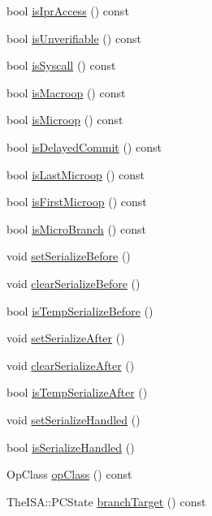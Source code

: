 \begin{DoxyCompactItemize}
bool \hyperlink{classBaseDynInst_aa201775c9e5befb0bf84cdd7b24519b3}{isIprAccess} () const 
\item 
bool \hyperlink{classBaseDynInst_ae9cbcc655cf8d63153d0c3f8bbf59841}{isUnverifiable} () const 
\item 
bool \hyperlink{classBaseDynInst_afa3ec9c6fc7c50b26c6811c3bf1bb5f0}{isSyscall} () const 
\item 
bool \hyperlink{classBaseDynInst_a1f7c99c1d36381c9aff41f00261d06df}{isMacroop} () const 
\item 
bool \hyperlink{classBaseDynInst_a19f74cdac8afa870418c056c72645187}{isMicroop} () const 
\item 
bool \hyperlink{classBaseDynInst_aebb2ebf9a7a910fcd247833ab88843b3}{isDelayedCommit} () const 
\item 
bool \hyperlink{classBaseDynInst_ac600348c1afe65d9299c9635d6ea5773}{isLastMicroop} () const 
\item 
bool \hyperlink{classBaseDynInst_a937b23736e22f67d6b168c0c029deec4}{isFirstMicroop} () const 
\item 
bool \hyperlink{classBaseDynInst_a369f5792a76744815dbb1bcba6e25618}{isMicroBranch} () const 
\item 
void \hyperlink{classBaseDynInst_a820fdb5f79e789fc8efffb15f1995695}{setSerializeBefore} ()
\item 
void \hyperlink{classBaseDynInst_a09b692cf6e7b00c1160248452fa24d4b}{clearSerializeBefore} ()
\item 
bool \hyperlink{classBaseDynInst_a4df2bcaf5414d6db99fb8a5b0aba708a}{isTempSerializeBefore} ()
\item 
void \hyperlink{classBaseDynInst_a3e4776abfedcc80df8c826a7f3c3efd3}{setSerializeAfter} ()
\item 
void \hyperlink{classBaseDynInst_abe42baa87e7660df60248deec78f8d5a}{clearSerializeAfter} ()
\item 
bool \hyperlink{classBaseDynInst_a8d1ad9904dbbde344554070bfaaab86f}{isTempSerializeAfter} ()
\item 
void \hyperlink{classBaseDynInst_ad115419b3ec6552a9db93ba349c73285}{setSerializeHandled} ()
\item 
bool \hyperlink{classBaseDynInst_a33db384950219c3c71206fbb2c7d8025}{isSerializeHandled} ()
\item 
OpClass \hyperlink{classBaseDynInst_aa4919f97cae20d4d82391c1fc6d5fda6}{opClass} () const 
\item 
TheISA::PCState \hyperlink{classBaseDynInst_a066dfcf24b065ae319cc2d27aa4eb09c}{branchTarget} () const 

\end{DoxyCompactItemize}
